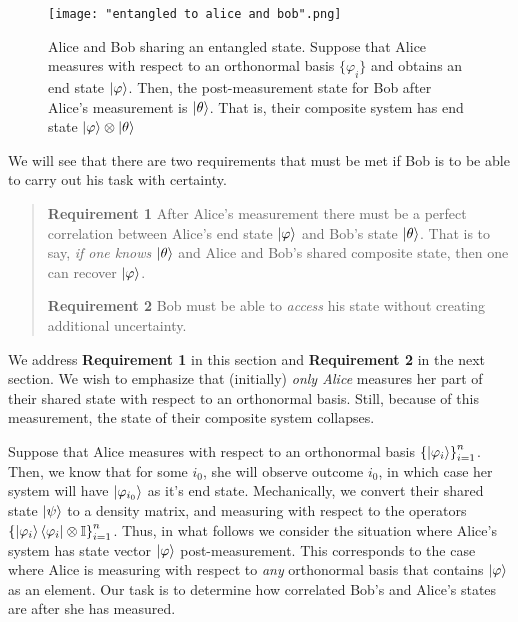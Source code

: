 \begin{figure}[h]
    \centering
    \texttt{[image: "entangled to alice and bob".png]}
    \caption{Alice and Bob sharing an entangled state. Suppose that Alice measures with respect to an orthonormal basis $\{\varphi_i\}$ and obtains an end state $\ket{\varphi}$.  Then, the post-measurement state for Bob after Alice's measurement is $\ket{\theta}$. That is, their composite system has end state $\ket{\varphi}\otimes\ket{\theta}$}
    \label{fig:entanglement}
\end{figure}


We will see that there are two requirements that must be met if Bob is to be able to carry out his task with certainty.

\begin{quote} 
    {\bf{Requirement 1}} After Alice's measurement there must be a perfect correlation between Alice's end state $\ket{\varphi}$ and Bob's state $\ket{\theta}$.  That is to say, {\emph{if one knows}} $\ket{\theta}$ and Alice and Bob's shared composite state, then one can recover $\ket{\varphi}$.
    \medskip
    
    {\bf{Requirement 2}} Bob must be able to {\emph{access}} his state without creating additional uncertainty.
   
\end{quote}


We address {\bf{Requirement 1}} in this section and {\bf{Requirement 2}} in the next section.  We wish to emphasize that (initially) {\emph{only Alice}} measures her part of their shared state with respect to an orthonormal basis.  Still, because of this measurement, the state of their composite system collapses.  

Suppose that Alice measures with respect to an orthonormal basis ${\{\ket{\varphi_i}\}}_{i=1}^{n}$.  Then, we know that for some $i_0$, she will observe outcome $i_0$, in which case her system will have $\ket{\varphi_{i_0}}$ as it's end state. Mechanically, we 
convert their shared state $\ket{\psi}$ to a density matrix, and measuring with respect to the operators ${\{\ket{\varphi_i}\bra{\varphi_i}\otimes \mathbb{I} \}}_{i=1}^n$.  Thus, in what follows we consider the situation where Alice's system has state vector $\ket{\varphi}$ post-measurement.  This corresponds to the case where Alice is measuring with respect to {\emph{any}} orthonormal basis that contains $\ket{\varphi}$ as an element. Our task is to determine how correlated Bob's and Alice's states are after she has measured.  

